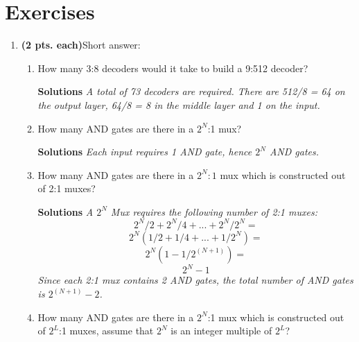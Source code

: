 \section{Exercises}
\label{section:comboBbExercises}
\graphicspath{ {./chapter04/FigHw} }

\begin{enumerate}
    \item \textbf{ (2 pts. each)}Short answer:
        \begin{enumerate}
            \item How many 3:8 decoders would it take to build a 9:512 decoder?

                \begin{onlysolution} \textbf{Solutions} \itshape{A total of 73 decoders are required.  There
                        are 512/8 = 64 on
                    the output layer, 64/8 = 8 in the middle layer and 1 on the input.}
                \end{onlysolution}
            \item How many AND gates are there in a $2^N$:1 mux?

                \begin{onlysolution} \textbf{Solutions} \itshape{ Each input requires 1 AND gate, hence $2^N$
                    AND gates.}
                \end{onlysolution}
            \item How many AND gates are there in a $2^N:1$ mux which is
                constructed out of 2:1 muxes?

                \begin{onlysolution} \textbf{Solutions} \itshape{ A $2^N$ Mux requires the following number
                        of 2:1 muxes:
                        $$ 2^N/2 + 2^N/4 + ... + 2^N/2^N = $$
                        $$ 2^N(1/2 + 1/4 + ... + 1/2^N) = $$
                        $$ 2^N(1-1/2^(N+1)) =  $$
                        $$ 2^N - 1  $$
                        Since each 2:1 mux contains 2 AND gates, the total number of AND gates is
                        $2^(N+1) - 2$.
                    }
                \end{onlysolution}

            \item How many AND gates are there in a $2^N$:1 mux which is
                constructed out of $2^L$:1 muxes, assume that
                $2^N$ is an integer multiple of $2^L$?


\end{enumerate}
\end{enumerate}
